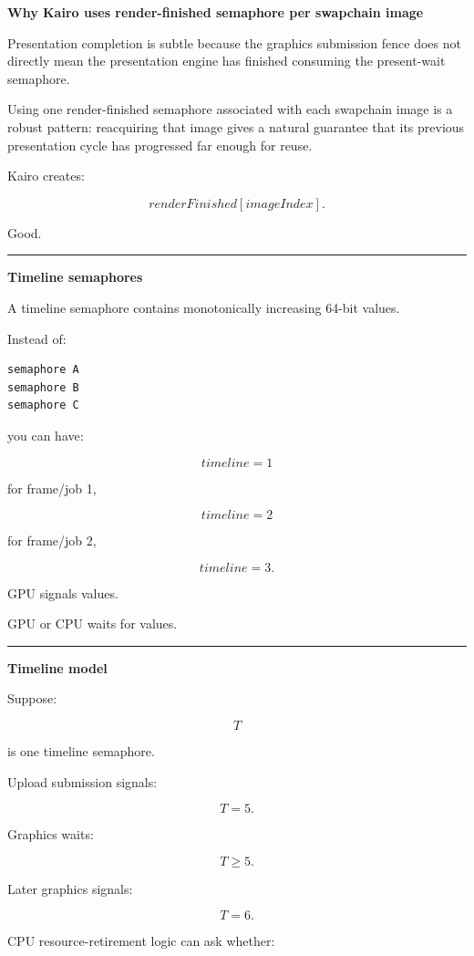 \textbf{Why Kairo uses render-finished semaphore per swapchain image}

Presentation completion is subtle because the graphics submission fence does not directly mean the presentation engine has finished consuming the present-wait semaphore.

Using one render-finished semaphore associated with each swapchain image is a robust pattern: reacquiring that image gives a natural guarantee that its previous presentation cycle has progressed far enough for reuse.

Kairo creates:

\[
renderFinished[imageIndex].
\]

Good.

\begin{center}\rule{0.5\linewidth}{0.5pt}\end{center}

\textbf{Timeline semaphores}

A timeline semaphore contains monotonically increasing 64-bit values.

Instead of:

\begin{verbatim}
semaphore A
semaphore B
semaphore C
\end{verbatim}

you can have:

\[
timeline=1
\]

for frame/job 1,

\[
timeline=2
\]

for frame/job 2,

\[
timeline=3.
\]

GPU signals values.

GPU or CPU waits for values.

\begin{center}\rule{0.5\linewidth}{0.5pt}\end{center}

\textbf{Timeline model}

Suppose:

\[
T
\]

is one timeline semaphore.

Upload submission signals:

\[
T=5.
\]

Graphics waits:

\[
T\ge5.
\]

Later graphics signals:

\[
T=6.
\]

CPU resource-retirement logic can ask whether:

